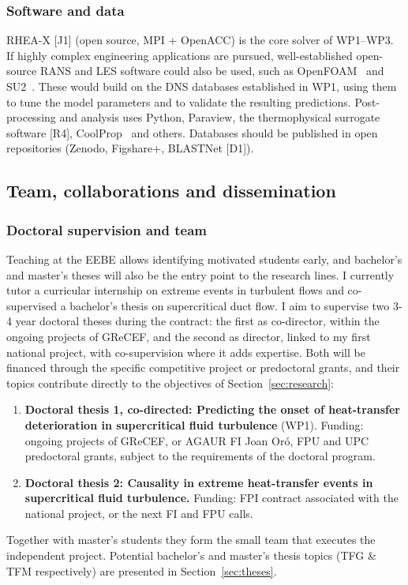 \documentclass[11pt]{article}
\newcommand{\NEW}[1]{\iffinal #1\else{\color{red}#1}\fi}
\begin{document}
\subsubsection{Software and data} 
RHEA-X [J1] (open source, MPI + OpenACC) is the core solver of WP1--WP3. 
If highly complex engineering applications are pursued, well-established open-source RANS and LES software could also be used, such as OpenFOAM~\cite{Weller1998} and SU2~\cite{Economon2016}. %
These would build on the DNS databases established in WP1, using them to tune the model parameters and to validate the resulting predictions.
Post-processing and analysis uses Python, Paraview, the thermophysical surrogate software [R4],  CoolProp~\cite{CoolProp2014} and others. 
Databases should be published in open repositories (Zenodo, Figshare+, BLASTNet [D1]).


\subsection{Team, collaborations and dissemination}\label{sec:mobility}\label{sec:dissemination}

\subsubsection{Doctoral supervision and team}
Teaching at the EEBE allows identifying motivated students early, and bachelor's and master's theses will also be the entry point to the research lines. 
I currently tutor a curricular internship on extreme events in turbulent flows and co-supervised a bachelor's thesis on supercritical duct flow. 
I aim to supervise two 3-4 year doctoral theses during the contract: the first as co-director, within the ongoing projects of GReCEF, and the second as director, linked to my first national project, with co-supervision where it adds expertise. 
Both will be financed through the specific competitive project or predoctoral grants, and their topics contribute directly to the objectives of Section~\ref{sec:research}:
\begin{enumerate}
  \item \textbf{Doctoral thesis 1, co-directed: Predicting the onset of heat-transfer \NEW{deterioration} in supercritical fluid turbulence} (WP1). Funding: ongoing projects of GReCEF, or AGAUR FI Joan Or\'o, FPU and UPC predoctoral grants, subject to the requirements of the doctoral program.
  \item \textbf{Doctoral thesis 2: Causality in extreme heat-transfer events in supercritical fluid turbulence.} Funding: FPI contract associated with the national project, or the next FI and FPU calls.
\end{enumerate}
Together with master's students they form the small team that executes the independent project.
Potential \NEW{bachelor's and master's thesis} topics (TFG \& TFM respectively) are presented in Section~\ref{sec:theses}.
\end{document}
